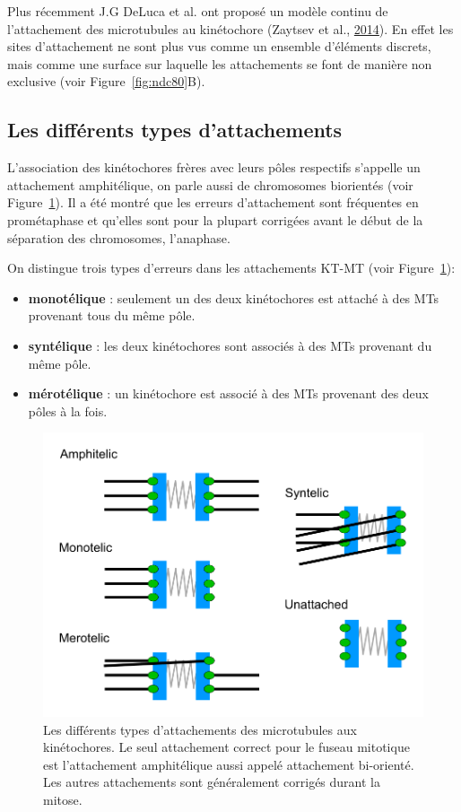 \documentclass[12pt,a4paper,twoside,openright]{book}
\begin{document}
Plus récemment J.G DeLuca et al. ont proposé un modèle continu de
l'attachement des microtubules au kinétochore (Zaytsev et al.,
\protect\hyperlink{ref-Zaytsev2014}{2014}). En effet les sites
d'attachement ne sont plus vus comme un ensemble d'éléments discrets,
mais comme une surface sur laquelle les attachements se font de manière
non exclusive (voir Figure~\ref{fig:ndc80}B).

\subsection{Les différents types
d'attachements}\label{sec:attachments-type}

L'association des kinétochores frères avec leurs pôles respectifs
s'appelle un attachement amphitélique, on parle aussi de chromosomes
biorientés (voir Figure~\ref{fig:attachements}). Il a été montré que les
erreurs d'attachement sont fréquentes en prométaphase et qu'elles sont
pour la plupart corrigées avant le début de la séparation des
chromosomes, l'anaphase.

On distingue trois types d'erreurs dans les attachements KT-MT (voir
Figure~\ref{fig:attachements}):

\begin{itemize}
\item
  \textbf{monotélique} : seulement un des deux kinétochores est attaché
  à des MTs provenant tous du même pôle.
\item
  \textbf{syntélique} : les deux kinétochores sont associés à des MTs
  provenant du même pôle.
\item
  \textbf{mérotélique} : un kinétochore est associé à des MTs provenant
  des deux pôles à la fois.
\end{itemize}

\begin{figure}[htbp]
\centering
\includegraphics{figures/intro/attachments.png}
\caption{\label{fig:attachements}Les différents types d'attachements des
microtubules aux kinétochores. Le seul attachement correct pour le
fuseau mitotique est l'attachement amphitélique aussi appelé attachement
bi-orienté. Les autres attachements sont généralement corrigés durant la
mitose.}
\end{figure}
\end{document}
